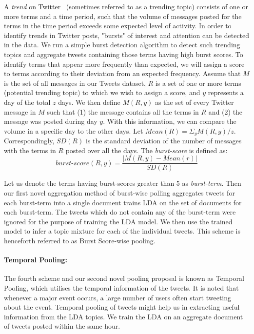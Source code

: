 \documentclass{sig-alternate}
\begin{document}
A \textit{trend} on Twitter~\cite{mor} (sometimes referred to as a trending
topic) consists of one or more terms and a time period, such that the
volume of messages posted for the terms in the time period exceeds
some expected level of activity.  In order to identify trends in
Twitter posts, "bursts" of interest and attention can be detected in
the data. We run a simple burst detection algorithm to detect such
trending topics and aggregate tweets containing those terms having
high burst scores.  To identify terms that appear more frequently than
expected, we will assign a score to terms according to their deviation
from an expected frequency. Assume that $M$ is the set of all messages
in our Tweets dataset, $R$ is a set of one or more terms (potential trending topic) to which we wish to assign a score, and $y$ represents a day of the total $z$
days. We then define $M(R, y)$ as the set of every Twitter message in
$M$ such that (1) the message contains all the terms in $R$ and (2)
the message was posted during day $y$. With this information, we can
compare the volume in a specific day to the other days. Let $ Mean(R)
= \Sigma_y M(R,y) / z $.  Correspondingly, $ SD(R) $ is the standard
deviation of the number of messages with the terms in $R$ posted over
all the days. The \textit{burst-score} is defined as:
\[
\mathit{burst\textrm{-}score}(R,y) = \frac{|M(R,y) - Mean(r)|}{SD(R)} 
\]

Let us denote the terms having burst-scores greater than 5 as
\textit{burst-term}.  Then our first novel aggregation method of
burst-wise polling aggregates tweets for each burst-term into a single
document trains LDA on the set of documents for each burst-term. The
tweets which do not contain any of the burst-term were ignored for the
purpose of training the LDA model. We then use the trained model to
infer a topic mixture for each of the individual tweets. This scheme
is henceforth referred to as Burst Score-wise pooling.

\paragraph{Temporal Pooling: }

The fourth scheme and our second novel pooling proposal is known as
Temporal Pooling, which utilises the temporal information of the tweets. It
is noted that whenever a major event occurs, a large number of users
often start tweeting about the event. Temporal pooling of tweets might help
us in extracting useful information from the LDA topics. We train the
LDA on an aggregate document of tweets posted within the same hour.
\end{document}
